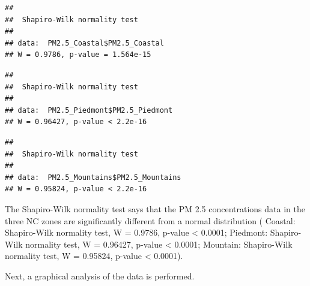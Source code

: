 \documentclass[12pt,]{article}
\newenvironment{Shaded}{\begin{snugshade}}{\end{snugshade}}
\newcommand{\KeywordTok}[1]{\textcolor[rgb]{0.13,0.29,0.53}{\textbf{#1}}}
\newcommand{\OperatorTok}[1]{\textcolor[rgb]{0.81,0.36,0.00}{\textbf{#1}}}
\newcommand{\NormalTok}[1]{#1}
\begin{document}
\begin{Shaded}
\end{Shaded}

\begin{verbatim}
## 
##  Shapiro-Wilk normality test
## 
## data:  PM2.5_Coastal$PM2.5_Coastal
## W = 0.9786, p-value = 1.564e-15
\end{verbatim}

\begin{Shaded}
\end{Shaded}

\begin{verbatim}
## 
##  Shapiro-Wilk normality test
## 
## data:  PM2.5_Piedmont$PM2.5_Piedmont
## W = 0.96427, p-value < 2.2e-16
\end{verbatim}

\begin{Shaded}
\end{Shaded}

\begin{verbatim}
## 
##  Shapiro-Wilk normality test
## 
## data:  PM2.5_Mountains$PM2.5_Mountains
## W = 0.95824, p-value < 2.2e-16
\end{verbatim}

The Shapiro-Wilk normality test says that the PM 2.5 concentrations data
in the three NC zones are significantly different from a normal
distribution ( Coastal: Shapiro-Wilk normality test, W = 0.9786, p-value
\textless{} 0.0001; Piedmont: Shapiro-Wilk normality test, W = 0.96427,
p-value \textless{} 0.0001; Mountain: Shapiro-Wilk normality test, W =
0.95824, p-value \textless{} 0.0001).

Next, a graphical analysis of the data is performed.
\end{document}
